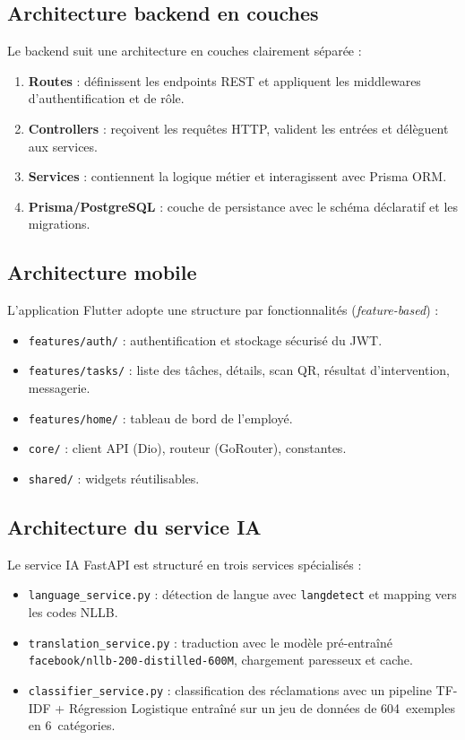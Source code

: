 \subsection{Architecture backend en couches}
Le backend suit une architecture en couches clairement séparée :
\begin{enumerate}
    \item \textbf{Routes} : définissent les endpoints REST et appliquent les middlewares d'authentification et de rôle.
    \item \textbf{Controllers} : reçoivent les requêtes HTTP, valident les entrées et délèguent aux services.
    \item \textbf{Services} : contiennent la logique métier et interagissent avec Prisma ORM.
    \item \textbf{Prisma/PostgreSQL} : couche de persistance avec le schéma déclaratif et les migrations.
\end{enumerate}

\subsection{Architecture mobile}
L'application Flutter adopte une structure par fonctionnalités (\textit{feature-based}) :
\begin{itemize}
    \item \texttt{features/auth/} : authentification et stockage sécurisé du JWT.
    \item \texttt{features/tasks/} : liste des tâches, détails, scan QR, résultat d'intervention, messagerie.
    \item \texttt{features/home/} : tableau de bord de l'employé.
    \item \texttt{core/} : client API (Dio), routeur (GoRouter), constantes.
    \item \texttt{shared/} : widgets réutilisables.
\end{itemize}

\subsection{Architecture du service IA}
Le service IA FastAPI est structuré en trois services spécialisés :
\begin{itemize}
    \item \texttt{language\_service.py} : détection de langue avec \texttt{langdetect} et mapping vers les codes NLLB.
    \item \texttt{translation\_service.py} : traduction avec le modèle pré-entraîné \texttt{facebook/nllb-200-distilled-600M}, chargement paresseux et cache.
    \item \texttt{classifier\_service.py} : classification des réclamations avec un pipeline TF-IDF + Régression Logistique entraîné sur un jeu de données de 604~exemples en 6~catégories.
\end{itemize}

